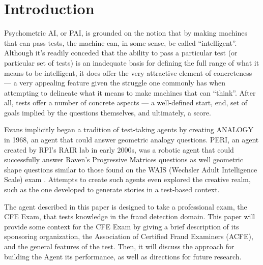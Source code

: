 \section{Introduction}
\label{sect:introduction}

Psychometric AI, or PAI, is grounded on the notion that by making machines that can pass tests, the machine can, in some sense, be called ``intelligent''\cite{bringsjord_schimanski_2004}.  Although it's readily conceded that the ability to pass a particular test (or particular set of tests) is an inadequate basis for defining the full range of what it means to be intelligent, it does offer the very attractive element of concreteness\cite{bringsjord_schimanski_2004} --- a very appealing feature given the struggle one commonly has when attempting to delineate what it means to make machines that can ``think''.  After all, tests offer a number of concrete aspects --- a well-defined start, end, set of goals implied by the questions themselves, and ultimately, a score.  

Evans implicitly began a tradition of test-taking agents by creating ANALOGY in 1968, an agent that could answer geometric analogy questions\cite{evans_1968}.  PERI, an agent created by RPI's RAIR lab in early 2000s, was a robotic agent that could successfully answer Raven's Progressive Matrices questions\cite{raven_1962} as well geometric shape questions similar to those found on the WAIS (Wechsler Adult Intelligence Scale) exam \cite{bringsjord_schimanski_2004}.  Attempts to create such agents even explored the creative realm, such as the one developed to generate stories in a test-based context\cite{bringsjord_schimanski_2004,bringsjord_ferrucci_2000,torrance_1990}.  

The agent described in this paper is designed to take a professional exam, the CFE Exam, that tests knowledge in the fraud detection domain.  This paper will provide some context for the CFE Exam by giving a brief description of its sponsoring organization, the Association of Certified Fraud Examiners (ACFE), and the general features of the test.  Then, it will discuss the approach for building the Agent its performance, as well as directions for future research.






